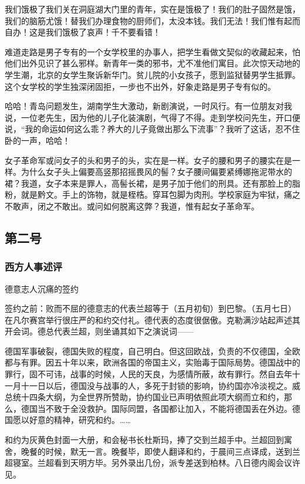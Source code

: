 我们饿极了我们关在洞庭湖大门里的青年，实在是饿极了！我们的肚子固然是饿，我们的脑筋尤饿！替我们办理食物的厨师们，太没本钱。我们无法！我们惟有起而自办！这是我们饿极了哀声！千不要看错！

难道走路是男子专有的一个女学校里的办事人，把学生看做文契似的收藏起来，怕他们出外见识了甚么邪样。新青年一类的邪书，尤不准他们寓目。此次惊天动地的学生潮，北京的女学生聚诉新华门。贫儿院的小女孩子，愿到监狱替男学生抵罪。这个女学校的学生独深闭固拒，一步也不出外，好象走路是男子专有似的。

哈哈！青岛问题发生，湖南学生大激动，新剧演说，一时风行。有一位朋友对我说，一位老先生，因为他的儿子化装演剧，气得了不得。走到学校问先生，开口便说，“我的命运如何这么乖？养大的儿子竟做出那么下流事”？我听了这话，忍不住卧的一声，哈哈！

女子革命军或问女子的头和男子的头，实在是一样。女子的腰和男子的腰实在是一样。为什么女子头上偏要高竖那招摇畏风的髻？女子腰间偏要紧缚娜拖泥带水的裙？我道，女子本来是罪人，高髻长裙，是男子加于他们的刑具。还有那脸上的脂粉，就是黔文。手上的饰物，就是桎梏。穿耳包脚为肉刑。学校家庭为牢狱，痛之不敢声，闭之不敢出。或问如何脱离这弊？我道，惟有起女子革命军。

\subsection[第二号（一九一九年七月二十一）]{第二号}

\subsubsection{西方人事述评}

德意志人沉痛的签约

签约之前：败而不屈的德意志的代表兰超等于（五月初旬）到巴黎。（五月七日）在凡尔赛宫举行很庄严的和约交付礼。德代表的态度很倨傲。克勒满沙站起声述其开会词。德总代表兰超，则坐诵其如下之演说词——

德国军事破裂，德国失败的程度，自己明白。但这回欧战，负责的不仅德国，全欧都与有罪。因五十年以来，欧洲各国的帝国主义，实贻毒于国际局势。德国战中的罪行，固不可讳，战事的时候，人民的天良，为感情所蔽，故有罪行。然自去年十一月十一日以后，德国没与战事的人，多死于封锁的影响，协约国亦冷淡视之。威总统十四条大纲，为全世界所赞助，协约国业已声明依照此项大纲而立和约，那么，德国当不致于全没救护。国际同盟，各国都让加入，不能将德国丢在外边。德国愿以好意的精神，研究和约。……

和约为灰黄色封面一大册，和会秘书长杜斯玛，捧了交到兰超手中。兰超回到寓舍，晚餐的时候，默无一言。晚餐毕，即使人翻译和约，于晨间三点译成，送到兰超寝室。兰超看到天明方毕。另外录出几份，派专差送到柏林。八日德内阁会议许见。

